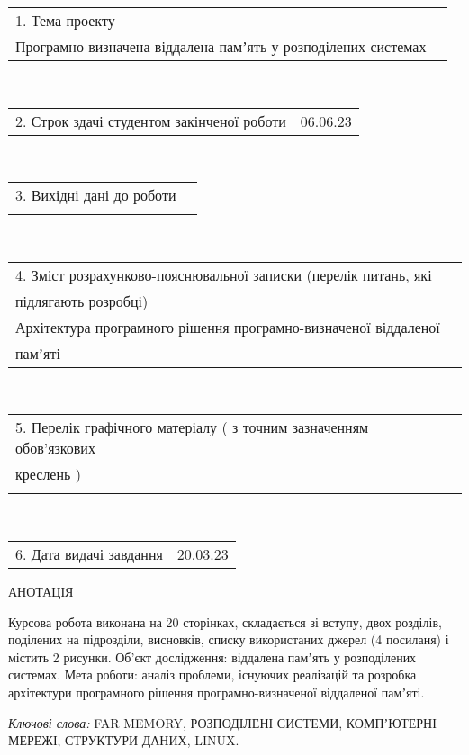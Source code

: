 \documentclass[14pt]{article}
\begin{document}
\fontsize{14}{17}\selectfont
\noindent
\begin{tabularx}{\textwidth}{l X}
    1. Тема проекту\\
    Програмно-визначена віддалена памʼять у розподілених системах\\
    \hline
\end{tabularx}
\\
\begin{tabularx}{\textwidth}{l X}
2. Строк здачі студентом закінченої роботи & 06.06.23\\
\cline{2-2}
\end{tabularx}
\\
\begin{tabularx}{\textwidth}{l X}
    3. Вихідні дані до роботи\\
    \\
    \hline
\end{tabularx}
\\
\begin{tabularx}{\textwidth}{l X}
    4. Зміст розрахунково-пояснювальної записки (перелік питань, які\\підлягають розробці)\\
    Архітектура програмного рішення програмно-визначеної віддаленої\\памʼяті\\
\end{tabularx}
\\
\begin{tabularx}{\textwidth}{l X}
    5.  Перелік графічного матеріалу ( з точним зазначенням обов’язкових\\ креслень )\\
    \\
    \hline
\end{tabularx}
\\
\begin{tabularx}{\textwidth}{l X}
    6. Дата видачі завдання & 20.03.23\\
\cline{2-2}
\end{tabularx}

\thispagestyle{empty}

\pagebreak

\begin{center}
АНОТАЦІЯ\\
\end{center}


\sloppy
Курсова робота виконана на 20 сторінках,  складається зі вступу, двох розділів, поділених на підрозділи, висновків, списку використаних джерел (4 посиланя) і містить 2 рисунки. Об’єкт дослідження: віддалена памʼять у розподілених системах. Мета роботи: аналіз проблеми, існуючих реалізацій та розробка архітектури програмного рішення програмно-визначеної віддаленої памʼяті.

\textit{Ключові слова:} FAR MEMORY, РОЗПОДІЛЕНІ СИСТЕМИ, КОМПʼЮТЕРНІ МЕРЕЖІ, СТРУКТУРИ ДАНИХ, LINUX.

\thispagestyle{empty}
\end{document}
